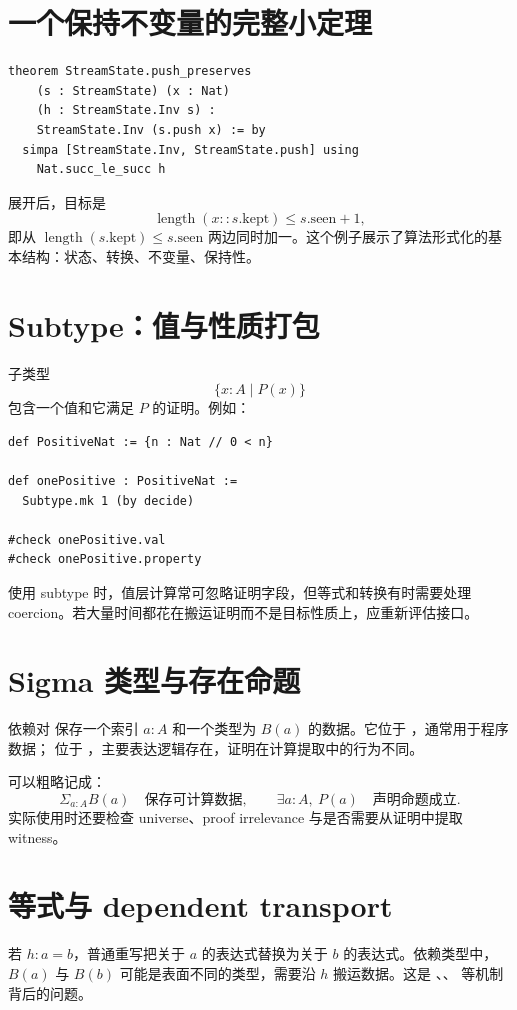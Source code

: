 \section{一个保持不变量的完整小定理}

\begin{lstlisting}
theorem StreamState.push_preserves
    (s : StreamState) (x : Nat)
    (h : StreamState.Inv s) :
    StreamState.Inv (s.push x) := by
  simpa [StreamState.Inv, StreamState.push] using
    Nat.succ_le_succ h
\end{lstlisting}
展开后，目标是
\[
\operatorname{length}(x::s.\mathrm{kept})
\le s.\mathrm{seen}+1,
\]
即从 $\operatorname{length}(s.\mathrm{kept})\le s.\mathrm{seen}$ 两边同时加一。这个例子展示了算法形式化的基本结构：状态、转换、不变量、保持性。

\section{Subtype：值与性质打包}

子类型
\[
\{x:A\mid P(x)\}
\]
包含一个值和它满足 $P$ 的证明。例如：
\begin{lstlisting}
def PositiveNat := {n : Nat // 0 < n}

def onePositive : PositiveNat :=
  Subtype.mk 1 (by decide)

#check onePositive.val
#check onePositive.property
\end{lstlisting}
使用 subtype 时，值层计算常可忽略证明字段，但等式和转换有时需要处理 coercion。若大量时间都花在搬运证明而不是目标性质上，应重新评估接口。

\section{Sigma 类型与存在命题}

依赖对  保存一个索引 $a:A$ 和一个类型为 $B(a)$ 的数据。它位于 ，通常用于程序数据； 位于 ，主要表达逻辑存在，证明在计算提取中的行为不同。

可以粗略记成：
\[
\Sigma_{a:A} B(a) \quad\text{保存可计算数据},\qquad
\exists a:A,\ P(a) \quad\text{声明命题成立}.
\]
实际使用时还要检查 universe、proof irrelevance 与是否需要从证明中提取 witness。

\section{等式与 dependent transport}

若 $h:a=b$，普通重写把关于 $a$ 的表达式替换为关于 $b$ 的表达式。依赖类型中，$B(a)$ 与 $B(b)$ 可能是表面不同的类型，需要沿 $h$ 搬运数据。这是 、、 等机制背后的问题。

